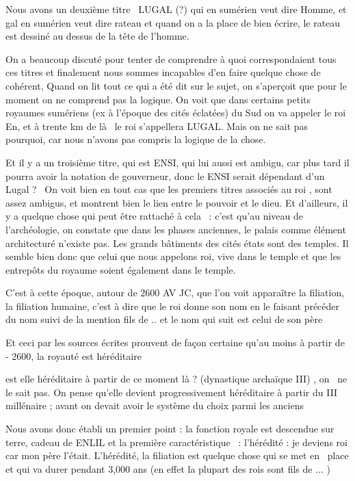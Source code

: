 \documentclass[a4paper]{article}
\begin{document}
Nous avons un deuxième titre \ LUGAL (?) qui en sumérien veut dire Homme, et gal en sumérien veut dire rateau et quand
on a la place de bien écrire, le rateau est dessiné au dessus de la tête de l'homme.


On a beaucoup discuté pour tenter de comprendre à quoi correspondaient tous ces titres et finalement nous sommes
incapables d'en faire quelque chose de cohérent, Quand on lit tout ce qui a été dit sur le sujet, on s'aperçoit que
pour le moment on ne comprend pas la logique. On voit que dans certains petits royaumes sumériens (ex à l'époque des
cités éclatées) du Sud on va appeler le roi En, et à trente km de là \ le roi s'appellera LUGAL. Mais on ne sait pas
pourquoi, car nous n'avons pas compris la logique de la chose.


Et il y a un troisième titre, qui est ENSI, qui lui aussi est ambigu, car plus tard il pourra avoir la notation de
gouverneur, donc le ENSI serait dépendant d'un Lugal ? \ On voit bien en tout cas que les premiers titres associés au
roi , sont assez ambigus, et montrent bien le lien entre le pouvoir et le dieu. Et d'ailleurs, il y a quelque chose qui
peut être rattaché à cela \ : c'est qu'au niveau de l'archéologie, on constate que dans les phases anciennes, le palais
comme élément architecturé n'existe pas. Les grands bâtiments des cités états sont des temples. Il semble bien donc que
celui que nous appelons roi, vive dans le temple et que les entrepôts du royaume soient également dans le temple.


C'est à cette époque, autour de 2600 AV JC, que l'on voit apparaître la filiation, la filiation humaine, c'est à dire
que le roi donne son nom en le faisant précéder du nom suivi de la mention {\textquotedbl} fils de .. {\textquotedbl}
et le nom qui suit est celui de son père

Et ceci par les sources écrites prouvent de façon certaine qu'au moins à partir de - 2600, la royauté est héréditaire

est elle héréditaire à partir de ce moment là ? (dynastique archaïque III) , on \ ne le sait pas. On pense qu'elle
devient progressivement héréditaire à partir du III millénaire ; avant on devait avoir le système du choix parmi les
anciens


Nous avons donc établi un premier point : la fonction royale est descendue sur terre, cadeau de ENLIL et la première
caractéristique \ : l'hérédité : je deviens roi car mon père l'était. L'hérédité, la filiation est quelque chose qui se
met en \ place et qui va durer pendant 3,000 ans (en effet la plupart des rois sont fils de ... )
\end{document}
